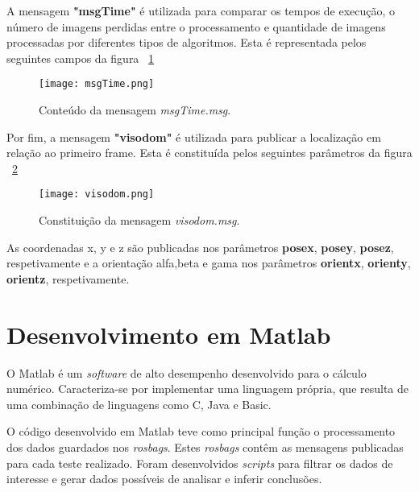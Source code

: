 A mensagem \textbf{"msgTime"} é utilizada para comparar os tempos de execução, o número de imagens perdidas entre o processamento e quantidade de imagens processadas por diferentes tipos de algoritmos. Esta é representada pelos seguintes campos da figura ~\ref{fig:msgTime}

\begin{figure}[h!] %
	\begin{center}
		\leavevmode		
		\texttt{[image: msgTime.png]}
		\caption{Conteúdo da mensagem \textit{msgTime.msg}.}
		\label{fig:msgTime}
	\end{center}
\end{figure}



Por fim, a mensagem \textbf{"visodom"} é utilizada para publicar a localização em relação ao primeiro frame. Esta é constituída pelos seguintes parâmetros da figura ~\ref{fig:visodom}

\begin{figure}[h!] %
	\begin{center}
		\leavevmode		
		\texttt{[image: visodom.png]}
		\caption{Constituição da mensagem \textit{visodom.msg}.}
		\label{fig:visodom}
	\end{center}
\end{figure}

As coordenadas x, y e z são publicadas nos parâmetros \textbf{posex}, \textbf{posey}, \textbf{posez}, respetivamente e a orientação alfa,beta e gama nos parâmetros \textbf{orientx}, \textbf{orienty}, \textbf{orientz}, respetivamente. 





\section{Desenvolvimento em Matlab}

O Matlab é um \textit{software} de alto desempenho desenvolvido para o cálculo numérico. Caracteriza-se por implementar uma linguagem própria, que resulta de uma combinação de linguagens como C, Java e Basic.

O código desenvolvido em Matlab teve como principal função o processamento dos dados guardados nos \textit{rosbags}. Estes \textit{rosbags} contêm as mensagens publicadas para cada teste realizado. Foram desenvolvidos \textit{scripts} para filtrar os dados de interesse e gerar dados possíveis de analisar e inferir conclusões.




